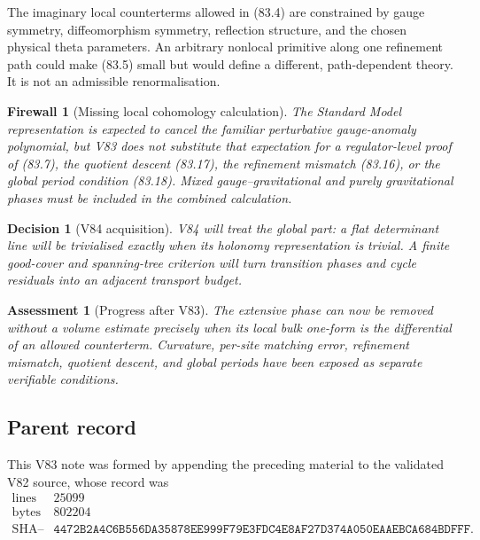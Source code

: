 \documentclass[11pt]{article}
\newtheorem{assessment}[theorem]{Assessment}
\newtheorem{firewall}[theorem]{Firewall}
\newtheorem{decision}[theorem]{Decision}
\begin{document}
\begin{warning}
\label{warn:v11v83-renormalisation}
The imaginary local counterterms allowed in (83.4) are constrained by
gauge symmetry, diffeomorphism symmetry, reflection structure, and
the chosen physical theta parameters.  An arbitrary nonlocal
primitive along one refinement path could make (83.5) small but would
define a different, path-dependent theory.  It is not an admissible
renormalisation.
\end{warning}

\begin{firewall}[Missing local cohomology calculation]
\label{fire:v11v83-boundary}
The Standard Model representation is expected to cancel the familiar
perturbative gauge-anomaly polynomial, but V83 does not substitute
that expectation for a regulator-level proof of (83.7), the quotient
descent (83.17), the refinement mismatch (83.16), or the global
period condition (83.18).  Mixed gauge--gravitational and purely
gravitational phases must be included in the combined calculation.
\end{firewall}

\begin{decision}[V84 acquisition]
\label{dec:v11v83-next}
V84 will treat the global part: a flat determinant line will be
trivialised exactly when its holonomy representation is trivial.
A finite good-cover and spanning-tree criterion will turn transition
phases and cycle residuals into an adjacent transport budget.
\end{decision}

\begin{assessment}[Progress after V83]
\label{ass:v11v83-status}
The extensive phase can now be removed without a volume estimate
precisely when its local bulk one-form is the differential of an
allowed counterterm.  Curvature, per-site matching error, refinement
mismatch, quotient descent, and global periods have been exposed as
separate verifiable conditions.
\end{assessment}

\subsection{Parent record}

This V83 note was formed by appending the preceding material to the
validated V82 source, whose record was
\[
\begin{array}{c|c}
\text{lines}&25099\\
\text{bytes}&802204\\
\text{SHA--256}&
\texttt{4472B2A4C6B556DA35878EE999F79E3FDC4E8AF27D374A050EAAEBCA684BDFFF}.
\end{array}                                                     \tag{83.19}
\]
\end{document}
